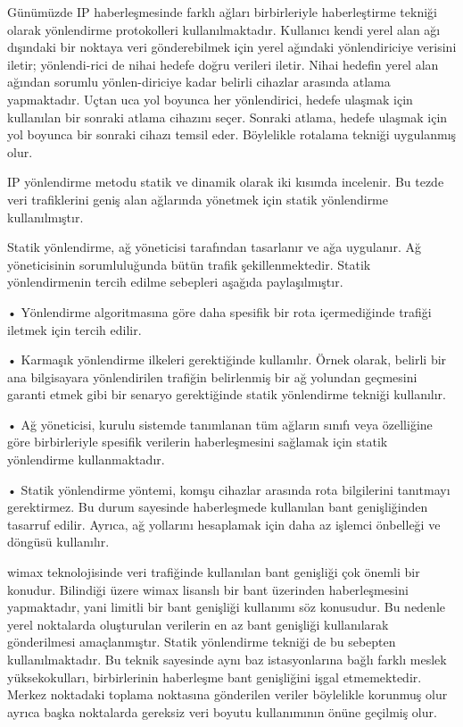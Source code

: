 Günümüzde IP haberleşmesinde farklı ağları birbirleriyle haberleştirme tekniği olarak yönlendirme protokolleri kullanılmaktadır. 
Kullanıcı kendi yerel alan ağı dışındaki bir noktaya veri gönderebilmek için yerel ağındaki yönlendiriciye verisini iletir; yönlendi-rici de nihai hedefe doğru verileri iletir. Nihai hedefin yerel alan ağından sorumlu yönlen-diriciye kadar belirli cihazlar arasında atlama yapmaktadır. Uçtan uca yol boyunca her yönlendirici, hedefe ulaşmak için kullanılan bir sonraki atlama cihazını seçer. Sonraki atlama, hedefe ulaşmak için yol boyunca bir sonraki cihazı temsil eder. Böylelikle rotalama tekniği uygulanmış olur. 

IP yönlendirme metodu statik ve dinamik olarak iki kısımda incelenir. Bu tezde veri trafiklerini geniş alan ağlarında yönetmek için statik yönlendirme kullanılmıştır.

Statik yönlendirme, ağ yöneticisi tarafından tasarlanır ve ağa uygulanır. Ağ yöneticisinin sorumluluğunda bütün trafik şekillenmektedir. Statik yönlendirmenin tercih edilme sebepleri aşağıda paylaşılmıştır. \cite{parziale_2006}

•	Yönlendirme algoritmasına göre daha spesifik bir rota içermediğinde trafiği iletmek için tercih edilir.

•	Karmaşık yönlendirme ilkeleri gerektiğinde kullanılır. Örnek olarak, belirli bir ana bilgisayara yönlendirilen trafiğin belirlenmiş bir ağ yolundan geçmesini garanti etmek gibi bir senaryo gerektiğinde statik yönlendirme tekniği kullanılır.

•	Ağ yöneticisi, kurulu sistemde tanımlanan tüm ağların sınıfı veya özelliğine göre birbirleriyle spesifik verilerin haberleşmesini sağlamak için statik yönlendirme kullanmaktadır. 

•	Statik yönlendirme yöntemi, komşu cihazlar arasında rota bilgilerini tanıtmayı gerektirmez. Bu durum sayesinde haberleşmede kullanılan bant genişliğinden tasarruf edilir. Ayrıca, ağ yollarını hesaplamak için daha az işlemci önbelleği ve döngüsü kullanılır.

\gls{wimax} teknolojisinde veri trafiğinde kullanılan bant genişliği çok önemli bir konudur. Bilindiği üzere \gls{wimax} lisanslı bir bant üzerinden haberleşmesini yapmaktadır, yani limitli bir bant genişliği kullanımı söz konusudur. Bu nedenle yerel noktalarda oluşturulan verilerin en az bant genişliği kullanılarak gönderilmesi amaçlanmıştır. Statik yönlendirme tekniği de bu sebepten kullanılmaktadır. Bu teknik sayesinde aynı baz istasyonlarına bağlı farklı meslek yüksekokulları, birbirlerinin haberleşme bant genişliğini işgal etmemektedir. Merkez noktadaki toplama noktasına gönderilen veriler böylelikle korunmuş olur ayrıca başka noktalarda gereksiz veri boyutu kullanımının önüne geçilmiş olur.

